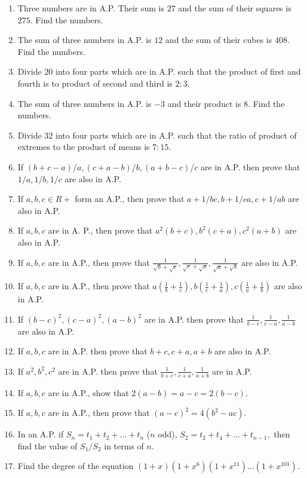 \begin{enumerate}
\item Three numbers are in A.P. Their sum is $27$ and the sum of their squares is $275$. Find the numbers.
\item The sum of three numbers in A.P. is $12$ and the sum of their cubes is $408$. Find the numbers.
\item Divide $20$ into four parts which are in A.P. such that the product of first and fourth is to product of second and third is
  $2:3$.
\item The sum of three numbers in A.P. is $-3$ and their product is $8$. Find the numbers.
\item Divide $32$ into four parts which are in A.P. such that the ratio of product of extremes to the product of means is $7:15$.
\item If $(b + c - a)/a, (c + a - b)/b, (a + b - c)/c$ are in A.P. then prove that $1/a, 1/b, 1/c$ are also in A.P.
\item If $a, b, c \in R+$ form an A.P., then prove that $a + 1/bc, b + 1/ca, c + 1/ab$ are also in A.P.
\item If $a, b, c$ are in A. P., then prove that $a^2(b + c), b^2(c + a), c^2(a + b)$ are also in A.P.
\item If $a, b, c$ are in A.P., then prove that $\frac{1}{\sqrt{b} + \sqrt{c}}, \frac{1}{\sqrt{c} + \sqrt{a}}, \frac{1}{\sqrt{a} +
  \sqrt{b}}$ are also in A.P.
\item If $a, b, c$ are in A.P., then prove that $a\left(\frac{1}{b} + \frac{1}{c}\right), b\left(\frac{1}{c} + \frac{1}{a}\right),
  c\left(\frac{1}{a} + \frac{1}{b}\right)$ are also in A.P.
\item If $(b - c)^2, (c - a)^2, (a - b)^2$ are in A.P. then prove that $\frac{1}{b - c}, \frac{1}{c - a}, \frac{1}{a - b}$ are also
  in A.P.
\item If $a, b, c$ are in A.P. then prove that $b + c, c + a, a + b$ are also in A.P.
\item If $a^2, b^2, c^2$ are in A.P. then prove that $\frac{1}{b+c}, \frac{1}{c+a}, \frac{1}{a + b}$ are in A.P.
\item If $a, b, c$ are in A.P., show that $2(a - b) = a - c = 2(b - c)$.
\item If $a, b , c$ are in A.P., then prove that $(a - c)^2 = 4(b^2 - ac)$.
\item In an A.P. if $S_n = t_1 + t_2 + \ldots + t_n$ ($n$ odd), $S_2 = t_2 + t_4 + \ldots + t_{n - 1},$ then find the value of
  $S_1/S_2$ in terms of $n$.
\item Find the degree of the equation $(1 + x)(1 + x^6)(1 + x^{11})\ldots (1+ x^{101})$.

\end{enumerate}
